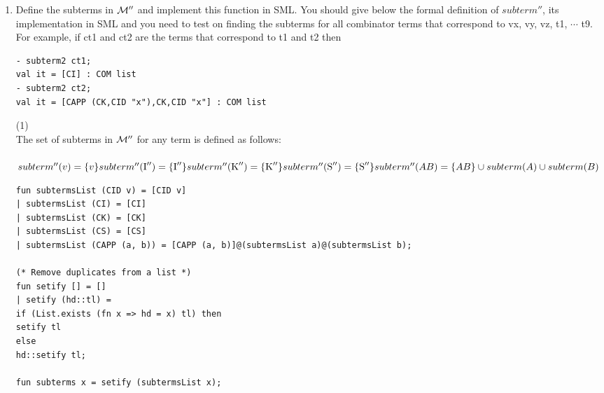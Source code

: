 \documentclass[11pt]{article}
\begin{document}
\begin{enumerate}
\pagebreak	
\item
  Define the subterms in ${\cal M}''$ and implement this function in SML.
  You should give below the formal definition of $subterm''$, its implementation   in SML and you need to test on finding the subterms for all combinator terms that correspond to  vx, vy, vz, t1, $\cdots$ t9.  For example, if ct1 and ct2  are the terms that correspond to t1 and t2 then
\begin{verbatim}
- subterm2 ct1;
val it = [CI] : COM list
- subterm2 ct2;
val it = [CAPP (CK,CID "x"),CK,CID "x"] : COM list
\end{verbatim}
 \hfill{(1)}\\ %
The set of subterms in ${\cal M}''$ for any term is defined as follows:\\ \\
$subterm''(v) = \{v\}\\
subterm''(\mbox{I}'') = \{\mbox{I}''\}\\
subterm''(\mbox{K}'') = \{\mbox{K}''\}\\
subterm''(\mbox{S}'') = \{\mbox{S}''\}\\
subterm''(AB) = \{AB\} \cup subterm(A) \cup subterm(B) $
\begin{verbatim}
fun subtermsList (CID v) = [CID v]
| subtermsList (CI) = [CI]
| subtermsList (CK) = [CK]
| subtermsList (CS) = [CS]
| subtermsList (CAPP (a, b)) = [CAPP (a, b)]@(subtermsList a)@(subtermsList b);

(* Remove duplicates from a list *)
fun setify [] = []
| setify (hd::tl) = 
if (List.exists (fn x => hd = x) tl) then
setify tl
else
hd::setify tl;

fun subterms x = setify (subtermsList x);

\end{verbatim}


\end{enumerate}
\end{document}
